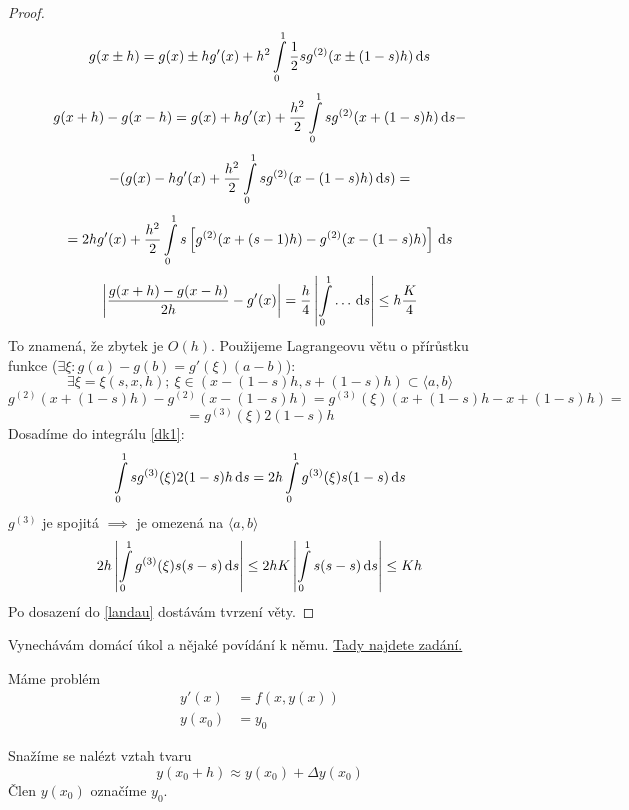 	\begin{proof}
		$$ g(x \pm h) = g(x) \pm h g'(x) + h^2 \int\limits_0^1 \frac{1}{2} s g^{(2)}
		(x \pm (1-s) h)\,\mathrm{d}s$$
		$$ g(x+h) - g(x-h) = g(x) + hg'(x) + \frac{h^2}{2} \int\limits_0^1 s g^{(2)} (x + (1-s) h)\,\mathrm{d}s -$$
		$$ - ( g(x) - hg'(x) + \frac{h^2}{2} \int\limits_0^1 s g^{(2)} (x - (1-s) h)\,\mathrm{d}s) =$$
		\begin{equation} \label{dk1}
			 = 2hg'(x) + \frac{h^2}{2} \int\limits_0^1 s \left[ g^{(2)} (x + (s-1)h) - g^{(2)}
			(x - (1-s)h) \right]\,\mathrm{d}s
		\end{equation}
		$$ \left| \frac{g(x+h) - g(x-h)}{2h} - g'(x)\right| = \frac{h}{4} \left|
		\int\limits_0^1 \dots\,\mathrm{d}s\right| \leq h \frac{K}{4} $$
		To znamená, že zbytek je $O(h)$. Použijeme Lagrangeovu větu o přírůstku funkce
		($\exists \xi:g(a) - g(b) = g'(\xi)(a -b)$):
		$$ \exists \xi= \xi(s,x,h);\ \xi \in (x- (1-s)h, s+(1-s)h) \subset \langle a,b \rangle$$
		$$ g^{(2)} (x+(1-s)h) - g^{(2)} (x-(1-s)h) = g^{(3)} (\xi) (x+(1-s)h - x +(1-s)h) =$$
		$$ = g^{(3)}(\xi) 2 (1-s) h$$
		Dosadíme do integrálu \eqref{dk1}:
		$$ \int\limits_0^1 s g^{(3)} (\xi) 2 (1-s)h\,\mathrm{d}s = 2h \int\limits_0^1 g^{(3)} (\xi) s (1-s)\,\mathrm{d}s $$
		$g^{(3)}$ je spojitá $\implies$ je omezená na $\langle a,b \rangle$
		$$ 2h \left| \int\limits_0^1 g^{(3)}(\xi) s(s-s)\,\mathrm{d}s \right| \leq 2hK \left| \int\limits_0^1 s(s-s)\,\mathrm{d}s \right|
		\leq Kh$$
		Po dosazení do \eqref{landau} dostávám tvrzení věty.
	\end{proof}
	
	\begin{note}
		Vynechávám domácí úkol a nějaké povídání k němu. \href{http://geraldine.fjfi.cvut.cz/~oberhuber/data/vyuka/num/dcv1.pdf}{Tady najdete zadání.}
	\end{note}
	
	
	Máme problém
	\begin{align*}
		y'(x) &= f(x,y(x)) \\
		y(x_0) &= y_0
	\end{align*}

	Snažíme se nalézt vztah tvaru
	$$ y(x_0 + h) \approx y(x_0) + \Delta y(x_0)$$
	Člen $y(x_0)$ označíme $y_0$.
	
